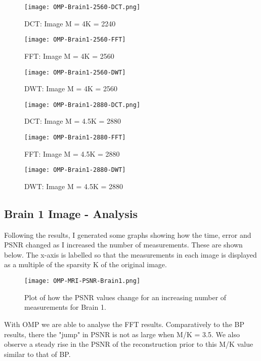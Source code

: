\documentclass[titlepage,oneside, 12pt]{book}
\theoremstyle{break}
\begin{document}
\begin{figure}[!h]
\centering
{}
  \texttt{[image: OMP-Brain1-2560-DCT.png]}
  \caption{DCT: Image M = 4K = 2240}\label{fig:OMP-Brain1-2560-DCT}
\endminipage
\hspace*{2em}
  \texttt{[image: OMP-Brain1-2560-FFT]}
  \caption{FFT: Image M = 4K = 2560}\label{fig:OMP-Brain1-2560-FFT}
\endminipage
\hspace*{2em}
%
  \texttt{[image: OMP-Brain1-2560-DWT]}
  \caption{DWT: Image M = 4K = 2560}\label{fig:OMP-Brain1-2560-DWT}
\endminipage
\hspace*{2em}
\end{figure}

\begin{figure}[!h]
\centering
{}
  \texttt{[image: OMP-Brain1-2880-DCT.png]}
  \caption{DCT: Image M = 4.5K = 2880}\label{fig:OMP-Brain1-2880-DCT}
\endminipage
\hspace*{2em}
  \texttt{[image: OMP-Brain1-2880-FFT]}
  \caption{FFT: Image M = 4.5K = 2880}\label{fig:OMP-Brain1-2880-FFT}
\endminipage
\hspace*{2em}
%
  \texttt{[image: OMP-Brain1-2880-DWT]}
  \caption{DWT: Image M = 4.5K = 2880}\label{fig:OMP-Brain1-2880-DWT}
\endminipage
\hspace*{2em}
\end{figure}
\clearpage

\subsection{Brain 1 Image - Analysis}

Following the results, I generated some graphs showing how the time, error and PSNR changed as I increased the number of measurements. These are shown below. The x-axis is labelled so that the measurements in each image is displayed as a multiple of the sparsity K of the original image. 

\begin{figure}[H]
\centering
\centerline{\texttt{[image: OMP-MRI-PSNR-Brain1.png]}}
\caption{Plot of how the PSNR values change for an increasing number of measurements for Brain 1.}
\label{fig:OMP-MRI-PSNR-Brain1}
\end{figure}


With OMP we are able to analyse the FFT results. Comparatively to the BP results, there the "jump" in PSNR is not as large when M/K = 3.5. We also observe a steady rise in the PSNR of the reconstruction prior to this M/K value similar to that of BP. 
\end{document}
